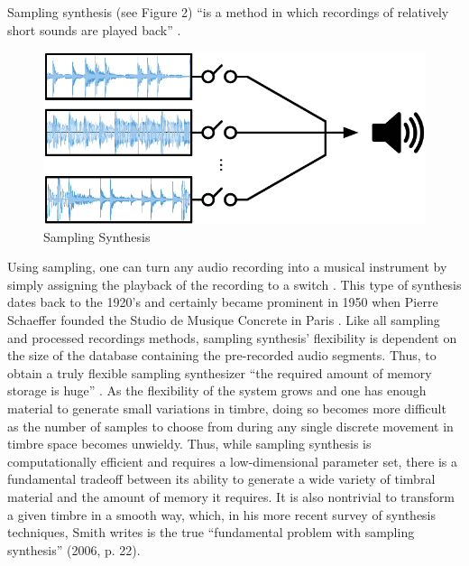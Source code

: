 \documentclass[12pt]{report} 	%
\numberwithin{figure}{chapter}
\numberwithin{table}{chapter}
\numberwithin{equation}{chapter}
\begin{document}
\begin{flushleft}
Sampling synthesis (see Figure 2) ``is a method in which recordings of relatively short sounds are played back'' \cite[p. 10]{Tolonen:1998bh}. 
\begin{figure}[h!]
\begin{center}
\includegraphics[scale=0.8]{SamplingSynthesis}
\caption[Sampling synthesis]{Sampling Synthesis}
\end{center}
\end{figure}
Using sampling, one can turn any audio recording into a musical instrument by simply assigning the playback of the recording to a switch \cite[p. 1]{Heise:2009sp}. This type of synthesis dates back to the 1920's and certainly became prominent in 1950 when Pierre Schaeffer founded the Studio de Musique Concrete in Paris \cite[p. 3]{Tolonen:1998bh}. Like all sampling and processed recordings methods, sampling synthesis' flexibility is dependent on the size of the database containing the pre-recorded audio segments. Thus, to obtain a truly flexible sampling synthesizer ``the required amount of memory storage is huge'' \cite[p. 11]{Tolonen:1998bh}. As the flexibility of the system grows and one has enough material to generate small variations in timbre, doing so becomes more difficult as the number of samples to choose from during any single discrete movement in timbre space becomes unwieldy. Thus, while sampling synthesis is computationally efficient and requires a low-dimensional parameter set, there is a fundamental tradeoff between its ability to generate a wide variety of timbral material and the amount of memory it requires. It is also nontrivial to transform a given timbre in a smooth way, which, in his more recent survey of synthesis techniques, Smith writes is the true ``fundamental problem with sampling synthesis'' (2006, p. 22).


\end{flushleft}
\end{document}
